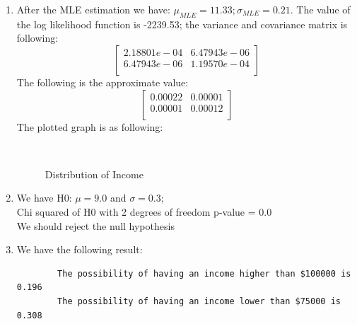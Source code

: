 \documentclass[letterpaper,12pt]{article}
\theoremstyle{definition}
\numberwithin{equation}{section}
\begin{document}
\begin{enumerate} [\bfseries (a)]
\item After the MLE estimation we have: \(\mu_{MLE} = 11.33; \sigma_{MLE} = 0.21 \). The value of the log likelihood function is -2239.53; the variance and covariance matrix is following:\\
\[
\begin{bmatrix}
2.18801e-04 &  6.47943e-06\\
6.47943e-06  & 1.19570e-04\\
\end{bmatrix}
\]
The following is the approximate value:\\
\[
\begin{bmatrix}
 0.00022&  0.00001\\
 0.00001&  0.00012\\
\end{bmatrix}
\]
The plotted graph is as following:\\
	\begin{figure}[H]
    		\centering
		\
    		\caption{Distribution of Income}
	\end{figure}\par

\item  We have H0: \(\mu = 9.0\) and \(\sigma = 0.3\);\\
Chi squared of H0 with 2 degrees of freedom p-value =  0.0\\
We should reject the null hypothesis\par

\item We have the following result:\\
\begin{verbatim}
		The possibility of having an income higher than $100000 is 0.196
		The possibility of having an income lower than $75000 is 0.308
\end{verbatim}

\end{enumerate}
\end{document}
